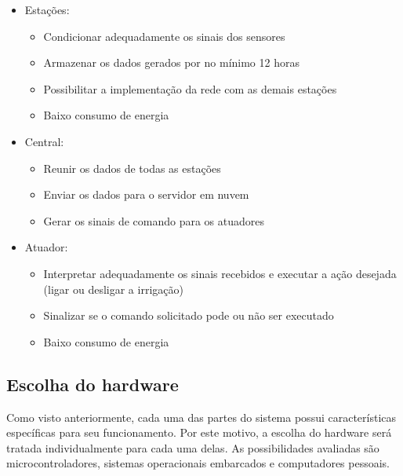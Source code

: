 	
		\begin{itemize}
			\item Estações:
				\begin{itemize}
					\item Condicionar adequadamente os sinais dos sensores
					\item Armazenar os dados gerados por no mínimo 12 horas
					\item Possibilitar a implementação da rede com as demais estações
					\item Baixo consumo de energia		
				\end{itemize}
			\item Central:
				\begin{itemize}
					\item Reunir os dados de todas as estações
					\item Enviar os dados para o servidor em nuvem
					\item Gerar os sinais de comando para os atuadores
				\end{itemize}
			\item Atuador:
			\begin{itemize}
				\item Interpretar adequadamente os sinais recebidos e executar a ação desejada (ligar ou desligar a irrigação)
				\item Sinalizar se o comando solicitado pode ou não ser executado 
				\item Baixo consumo de energia
			\end{itemize}				
		\end{itemize}		 

	\subsection{Escolha do hardware}
	Como visto anteriormente, cada uma das partes do sistema possui características específicas para seu funcionamento. Por este motivo, a escolha do hardware será tratada individualmente para cada uma delas. As possibilidades avaliadas são microcontroladores, sistemas operacionais embarcados e computadores pessoais. 
		
